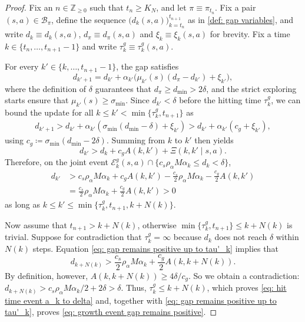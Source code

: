 \begin{proof}
Fix an $n \in \mathbb Z_{\ge 0}$ such that $t_n \ge K_N$,
and let $\pi \equiv \pi_{t_n}$.
Fix a pair $(s,a) \in \mathcal B_\pi$,
define the sequence $\big( d_k(s,a) \big)_{k=t_n}^{t_{n+1}}$ as in \autoref{def: gap variables}, and write $d_k \equiv d_k(s,a)$, $d_\pi \equiv d_\pi(s,a)$ and $\xi_k \equiv \xi_k(s,a)$ for brevity.
Fix a time $k \in \{t_n, \dots, t_{n+1}-1\}$ and write $\tau^g_k \equiv \tau^g_k(s,a)$.

For every $k' \in \{k, \dots, t_{n+1}-1\}$,
the gap satisfies
\[
d_{k'+1}
=
d_{k'} + \alpha_{k'} \big( \mu_{k'}(s) (d_\pi - d_{k'}) + \xi_{k'} \big) ,
\]
where the definition of $\delta$ guarantees that $d_\pi \ge d_{\min} > 2 \delta$,
and the strict exploring starts ensure that $\mu_{k'}(s) \ge \sigma_{\min}$. 
Since $d_{k'} < \delta$ before the hitting time $\tau^g_k$,
we can bound the update for all 
$k \le k' < \min\{ \tau^g_k, t_{n+1} \}$ 
as
\begin{align*}
d_{k'+1}
>
d_{k'} + \alpha_{k'} \left( \sigma_{\min}(d_{\min} - \delta) + \xi_{k'} \right)
>
d_{k'} + \alpha_{k'} \left( c_g + \xi_{k'} \right) ,
\end{align*}
using $c_g \coloneqq \sigma_{\min} ( d_{\min} - 2 \delta)$.
Summing from $k$ to $k'$ then yields
\[
d_{k'}
>
d_{k} + c_g A(k,k') + \Xi(k,k' \mid s,a) .
\]
Therefore, on the joint event $\mathcal E^g_k(s,a) \cap \{c_s \rho_\alpha M \alpha_k \leq d_k < \delta \}$,
\begin{align}
d_{k'}
&>
c_s \rho_\alpha M \alpha_k + c_g A(k,k') - \frac{c_s}{2} \rho_\alpha M \alpha_k - \frac{c_g}{2} A(k,k')
\nonumber
\\
\label{eq: gap remains positive up to tau'_k}
&=
\frac{c_s}{2} \rho_\alpha M \alpha_k + \frac{c_g}{2} A(k,k') > 0
\end{align}
as long as 
$k \le k' \le \min \{ \tau^g_k , t_{n+1} , k+N(k) \}$.


Now assume that $t_{n+1} > k+N(k)$, otherwise 
$\min\{ \tau^g_k , t_{n+1} \} \le k+N(k)$ 
is trivial.
Suppose for contradiction that $\tau^g_k = \infty$ because $d_k$ does not reach $\delta$ within $N(k)$ steps.
Equation \eqref{eq: gap remains positive up to tau'_k} implies that
\[
d_{k+N(k)}
>
\frac{c_s}{2} \rho_\alpha M \alpha_k + \frac{c_g}{2} A(k,k+N(k)) .
\]
By definition, however, $A(k,k+N(k)) \ge 4 \delta/c_g$. So we obtain a contradiction: $d_{k+N(k)}
>
c_s \rho_\alpha M \alpha_k / 2 + 2 \delta
> \delta .$
Thus, $\tau^g_k \le k+N(k)$, which proves \eqref{eq: hit time event a_k to delta}
and, together with \eqref{eq: gap remains positive up to tau'_k}, proves \eqref{eq: growth event gap remains positive}.


\end{proof}
